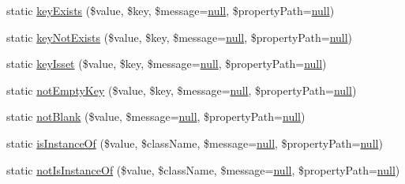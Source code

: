 \begin{DoxyCompactItemize}
\item 
static \mbox{\hyperlink{class_assert_1_1_assertion_a4151daea6c868e053d1607e89e6f7b2f}{key\+Exists}} (\$value, \$key, \$message=\mbox{\hyperlink{class_assert_1_1_assertion_af95d8b1582dd619cc0159041bc6892c5}{null}}, \$property\+Path=\mbox{\hyperlink{class_assert_1_1_assertion_af95d8b1582dd619cc0159041bc6892c5}{null}})
\item 
static \mbox{\hyperlink{class_assert_1_1_assertion_a586c3b8b52824167c4f542351725d36d}{key\+Not\+Exists}} (\$value, \$key, \$message=\mbox{\hyperlink{class_assert_1_1_assertion_af95d8b1582dd619cc0159041bc6892c5}{null}}, \$property\+Path=\mbox{\hyperlink{class_assert_1_1_assertion_af95d8b1582dd619cc0159041bc6892c5}{null}})
\item 
static \mbox{\hyperlink{class_assert_1_1_assertion_a260100347d6d1512d7e88fca1b672b8f}{key\+Isset}} (\$value, \$key, \$message=\mbox{\hyperlink{class_assert_1_1_assertion_af95d8b1582dd619cc0159041bc6892c5}{null}}, \$property\+Path=\mbox{\hyperlink{class_assert_1_1_assertion_af95d8b1582dd619cc0159041bc6892c5}{null}})
\item 
static \mbox{\hyperlink{class_assert_1_1_assertion_a40e6788826bc9226dde045b30c7319e8}{not\+Empty\+Key}} (\$value, \$key, \$message=\mbox{\hyperlink{class_assert_1_1_assertion_af95d8b1582dd619cc0159041bc6892c5}{null}}, \$property\+Path=\mbox{\hyperlink{class_assert_1_1_assertion_af95d8b1582dd619cc0159041bc6892c5}{null}})
\item 
static \mbox{\hyperlink{class_assert_1_1_assertion_a6a4fa1c32396f054e65b151221d89752}{not\+Blank}} (\$value, \$message=\mbox{\hyperlink{class_assert_1_1_assertion_af95d8b1582dd619cc0159041bc6892c5}{null}}, \$property\+Path=\mbox{\hyperlink{class_assert_1_1_assertion_af95d8b1582dd619cc0159041bc6892c5}{null}})
\item 
static \mbox{\hyperlink{class_assert_1_1_assertion_a49bf7215c3de60ad4259d913fdc42510}{is\+Instance\+Of}} (\$value, \$class\+Name, \$message=\mbox{\hyperlink{class_assert_1_1_assertion_af95d8b1582dd619cc0159041bc6892c5}{null}}, \$property\+Path=\mbox{\hyperlink{class_assert_1_1_assertion_af95d8b1582dd619cc0159041bc6892c5}{null}})
\item 
static \mbox{\hyperlink{class_assert_1_1_assertion_a8aee096127da09300153850574a7e050}{not\+Is\+Instance\+Of}} (\$value, \$class\+Name, \$message=\mbox{\hyperlink{class_assert_1_1_assertion_af95d8b1582dd619cc0159041bc6892c5}{null}}, \$property\+Path=\mbox{\hyperlink{class_assert_1_1_assertion_af95d8b1582dd619cc0159041bc6892c5}{null}})
\item 

\end{DoxyCompactItemize}
